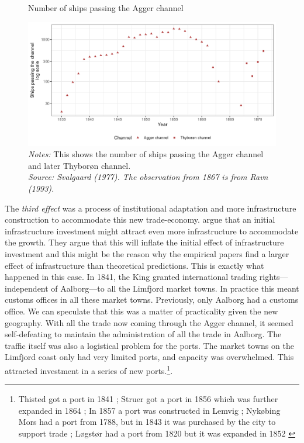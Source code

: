 \documentclass[11pt]{article}
\begin{document}
\begin{figure}[h]
\begin{center}
  \caption{\label{fig:channel} Number of ships passing the Agger channel}
  \includegraphics[width=1\textwidth]{Plots/Ship_trafic_channel.png}
  \parbox{0.9\textwidth}{
  \caption*{\footnotesize \textit{Notes:} This shows the number of ships passing the Agger channel and later Thyborøn channel. \\ \textit{Source: Svalgaard (1977). The observation from 1867 is from Ravn (1993).}}
}
\end{center}
\end{figure}

The \textit{third effect} was a process of institutional adaptation and more infrastructure construction to accommodate this new trade-economy. \cite{Redding2015} argue that an initial infrastructure investment might attract even more infrastructure to accommodate the growth. They argue that this will inflate the initial effect of infrastructure investment and this might be the reason why the empirical papers find a larger effect of infrastructure than theoretical predictions. This is exactly what happened in this case. In 1841, the King granted international trading rights— independent of Aalborg—to all the Limfjord market towns. In practice this meant customs offices in all these market towns. Previously, only Aalborg had a customs office. We can speculate that this was a matter of practicality given the new geography. With all the trade now coming through the Agger channel, it seemed self-defeating to maintain the administration of all the trade in Aalborg. The traffic itself was also a logistical problem for the ports. The market towns on the Limfjord coast only had very limited ports, and capacity was overwhelmed. This attracted investment in a series of new ports.\footnote{Thisted got a port in 1841 \citep[p. 384-386]{Dioerup1842Thisted}; Struer got a port in 1856 which was further expanded in 1864 \citep[vol V, p. 467]{Trap3}; In 1857 a port was constructed in Lemvig \citep[vol V, p. 474]{Trap3}; Nykøbing Mors had a port from 1788, but in 1843 it was purchased by the city to support trade \citep[vol IV, p. 214]{Trap3}; Løgstør had a port from 1820 but it was expanded in 1852 \citep[vol IV, pp. 399-400]{Trap3}}.
\end{document}
